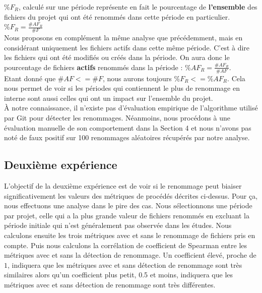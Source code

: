 $\%F_{R}$, calculé sur une période représente en fait le pourcentage de \textbf{l'ensemble} des fichiers du projet qui ont été renommés dans cette période en particulier. $\%F_{R} = \frac{\#AF_{R}}{\#F}$ \\

Nous proposons en complément la même analyse que précédemment, mais en considérant uniquement les fichiers actifs dans cette même période. C'est à dire les fichiers qui ont été modifiés ou créés dans la période. On aura donc le pourcentage de fichiers \textbf{actifs} renommés dans la période : 
$\%AF_{R} = \frac{\#AF_{R}}{\#AF}$. \\
Etant donné que ${\#AF} <= {\#F}$, nous aurons toujours $\%F_{R} <= \%AF_{R}$. Cela nous permet de voir si les périodes qui contiennent le plus de renommage en interne sont aussi celles qui ont un impact sur l'ensemble du projet.\\

À notre connaissance, il n'existe pas d'évaluation empirique de l'algorithme utilisé par Git pour détecter les renommages. Néanmoins, nous procédons à une évaluation manuelle de son comportement dans la Section 4 et nous n'avons pas noté de faux positif sur 100 renommages aléatoires récupérés par notre analyse.\\

\subsection{Deuxième expérience}

L'objectif de la deuxième expérience est de voir si le renommage peut biaiser significativement les valeurs des métriques de procédés décrites ci-dessus. Pour ça, nous effectuons une analyse dans le pire des cas. Nous sélectionnons une période par projet, celle qui a la plus grande valeur de fichiers renommés en excluant la période initiale qui n'est généralement pas observée dans les études. Nous calculons ensuite les trois métriques avec et sans le renommage de fichiers pris en compte. Puis nous calculons la corrélation de coefficient de Spearman entre les métriques avec et sans la détection de renommage. Un coefficient élevé, proche de $1$, indiquera que les métriques avec et sans détection de renommage sont très similaires alors qu'un coefficient plus petit, 0.5 et moins, indiquera que les métriques avec et sans détection de renommage sont très différentes.\\  
